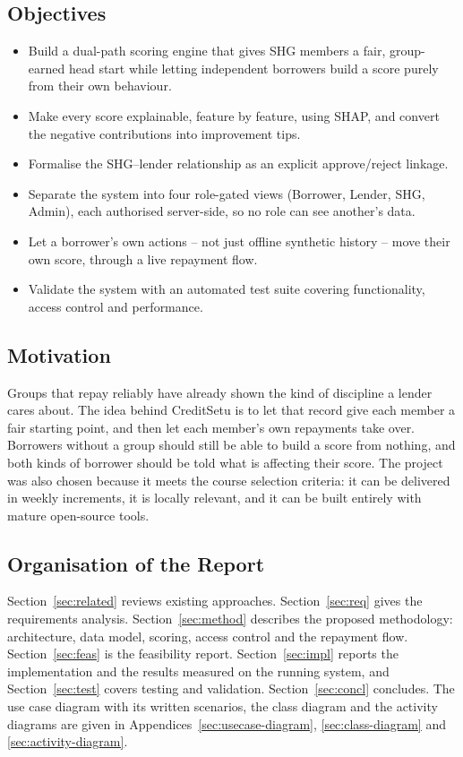 \documentclass[11pt,a4paper]{article}
\begin{document}
\subsection{Objectives}
\begin{itemize}
  \item Build a dual-path scoring engine that gives SHG members a fair,
  group-earned head start while letting independent borrowers build a score
  purely from their own behaviour.
  \item Make every score explainable, feature by feature, using SHAP, and
  convert the negative contributions into improvement tips.
  \item Formalise the SHG--lender relationship as an explicit
  approve/reject linkage.
  \item Separate the system into four role-gated views (Borrower, Lender,
  SHG, Admin), each authorised server-side, so no role can see another's
  data.
  \item Let a borrower's own actions -- not just offline synthetic history
  -- move their own score, through a live repayment flow.
  \item Validate the system with an automated test suite covering
  functionality, access control and performance.
\end{itemize}

\subsection{Motivation}
Groups that repay reliably have already shown the kind of discipline a
lender cares about. The idea behind CreditSetu is to let that record give
each member a fair starting point, and then let each member's own
repayments take over. Borrowers without a group should still be able to
build a score from nothing, and both kinds of borrower should be told what
is affecting their score. The project was also chosen because it meets the
course selection criteria: it can be delivered in weekly increments, it is
locally relevant, and it can be built entirely with mature open-source
tools.

\subsection{Organisation of the Report}
Section~\ref{sec:related} reviews existing approaches.
Section~\ref{sec:req} gives the requirements analysis.
Section~\ref{sec:method} describes the proposed methodology: architecture,
data model, scoring, access control and the repayment flow.
Section~\ref{sec:feas} is the feasibility report.
Section~\ref{sec:impl} reports the implementation and the results measured
on the running system, and Section~\ref{sec:test} covers testing and
validation. Section~\ref{sec:concl} concludes. The use case diagram with
its written scenarios, the class diagram and the activity diagrams are
given in Appendices~\ref{sec:usecase-diagram}, \ref{sec:class-diagram} and
\ref{sec:activity-diagram}.
\end{document}
